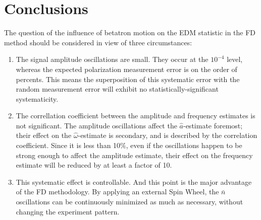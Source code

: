 \documentclass[a4paper]{jacow}
\newcommand{\w}{\omega}
\newcommand{\nbar}{\bar n}
\begin{document}
\section{Conclusions}
The question of the influence of betatron motion on the EDM statistic in the FD method should be considered
in view of three circumstances:
\begin{enumerate}
\item The signal amplitude oscillations are small. They occur at the $10^{-4}$ level, whereas the expected
  polarization measurement error is on the order of percents. This means the superposition of this systematic
  error with the random measurement error will exhibit no statistically-significant systematicity.
\item The correllation coefficient between the amplitude and frequency estimates is not significant. The amplitude
  oscillations affect the $\hat a$-estimate foremost; their effect on the $\hat\w$-estimate is secondary, and is
  described by the correlation coefficient. Since it is less than 10\%, even if the oscillations happen to be
  strong enough to affect the amplitude estimate, their effect on the frequency estimate will be reduced by
  at least a factor of 10.
\item This systematic effect is controllable. And this point is the major advantage of the FD methodology.
  By applying an external Spin Wheel, the $\nbar$ oscillations can be continuously minimized
  as much as necessary, without changing the experiment pattern.
\end{enumerate}
\end{document}
